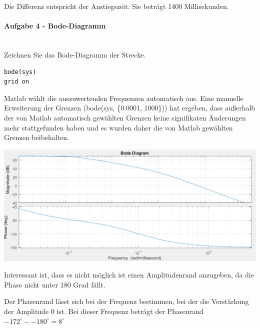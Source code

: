 \documentclass[            %
draft = false,             		%
paper = A4,                		%
pagesize = pdftex,         		%
fontsize = 10pt,           		%
DIV=15,                    		%
twoside = false,           		%
twocolumn = false,         		%
parskip = full,           		%
chapterprefix = false,      		%
appendixprefix = true,     		%
headinclude = false,       		%
footinclude = false,       		%
mpinclude = false,         		%
numbers = auto,            		%
cleardoublepage = plain,   		%
footnotes = multiple,      		%
titlepage = true,          		%
headings = normal,         		%
open = right,              		%
bibliography = openstyle,  		%
listof = chaptergapline,   		%
overfullrule = true,
]{scrbook}
\begin{document}
Die Differenz entspricht der Anstiegszeit. Sie beträgt 1400 Millisekunden.




\paragraph{Aufgabe 4 - Bode-Diagramm}~\\

Zeichnen Sie das Bode-Diagramm der Strecke.

\begin{lstlisting}[style=CStyle]
bode(sys)
grid on
\end{lstlisting}

Matlab wählt die auszuwertenden Frequenzen automatisch aus. Eine manuelle Erweiterung der Grenzen (bode(sys, \{0.0001, 1000\}))
hat ergeben, dass außerhalb der von Matlab automatisch gewählten Grenzen keine signifikaten Änderungen mehr stattgefunden haben
und es wurden daher die von Matlab gewählten Grenzen beibehalten.

\begin{center}
   \begin{minipage}[b]{1.0\textwidth}
      \includegraphics[scale=0.7]{Bilder/Bodeplot.PNG}
      \label{fig:Bodeplot} 
   \end{minipage}
\end{center}

Interessant ist, dass es nicht möglich ist einen Amplitudenrand anzugeben, da die Phase nicht unter 180 Grad fällt.

Der Phasenrand lässt sich bei der Frequenz bestimmen, bei der die Verstärkung der Amplitude 0 ist.
Bei dieser Frequenz beträgt der Phasenrand $-172^{\circ} - -180^{\circ} = 8^{\circ} $
\end{document}
